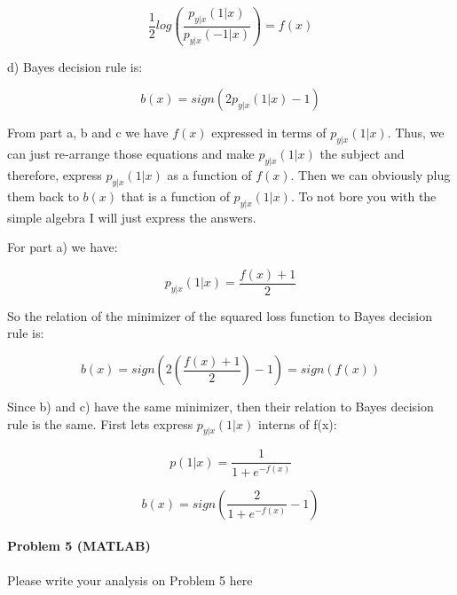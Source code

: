 \documentclass[12pt]{report}
\begin{document}
$$\frac{1}{2}log\left( \frac{p_{y|x}(1|x)}{p_{y|x}(-1|x)} \right) = f(x)$$

d) Bayes decision rule is:

$$ b(x) = sign(2p_{y|x}(1|x) -1)$$

From part a, b and c we have $f(x)$ expressed in terms of $p_{y|x}(1|x)$. Thus, we can just re-arrange those equations and make $p_{y|x}(1|x)$ the subject and therefore, express $p_{y|x}(1|x)$ as a function of $f(x)$. Then we can obviously plug them back to $b(x)$ that is a function of $p_{y|x}(1|x)$. To not bore you with the simple algebra I will just express the answers.

For part a) we have:

$$p_{y|x}(1|x) = \frac{f(x) + 1}{2}$$

So the relation of the minimizer of the squared loss function to Bayes decision rule is:

$$b(x) = sign(2\left( \frac{f(x) + 1}{2} \right) -1 ) = sign(f(x)) $$

Since b) and c) have the same minimizer, then their relation to Bayes decision rule is the same. First lets express $p_{y|x}(1|x)$ interns of f(x):

$$p(1|x) = \frac{1}{1+e^{-f(x)} }$$

$$ b(x) = sign \left( \frac{2}{1+e^{-f(x)}}   - 1 \right)$$

\paragraph{Problem 5 (MATLAB)}
Please write your analysis on Problem 5 here
\end{document}
